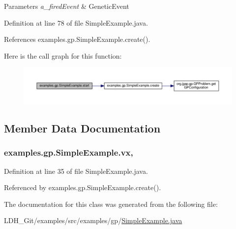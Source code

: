 \begin{DoxyParams}{Parameters}
{\em a\-\_\-fired\-Event} & Genetic\-Event\\
\hline
\end{DoxyParams}


Definition at line 78 of file Simple\-Example.\-java.



References examples.\-gp.\-Simple\-Example.\-create().



Here is the call graph for this function\-:
\nopagebreak
\begin{figure}[H]
\begin{center}
\leavevmode
\includegraphics[width=350pt]{classexamples_1_1gp_1_1_simple_example_ac5ede9710cc4936d29dac710dd1c49e6_cgraph}
\end{center}
\end{figure}




\subsection{Member Data Documentation}
\hypertarget{classexamples_1_1gp_1_1_simple_example_a2885a4fcda3e2c98c6be76031aed5ce9}{
\subsubsection[{vx}]{ examples.\-gp.\-Simple\-Example.\-vx\hspace{0.3cm}{\ttfamily [static]}, {\ttfamily [protected]}}}\label{classexamples_1_1gp_1_1_simple_example_a2885a4fcda3e2c98c6be76031aed5ce9}


Definition at line 35 of file Simple\-Example.\-java.



Referenced by examples.\-gp.\-Simple\-Example.\-create().



The documentation for this class was generated from the following file\-:\begin{DoxyCompactItemize}
\item 
L\-D\-H\-\_\-\-Git/examples/src/examples/gp/\hyperlink{gp_2_simple_example_8java}{Simple\-Example.\-java}\end{DoxyCompactItemize}
